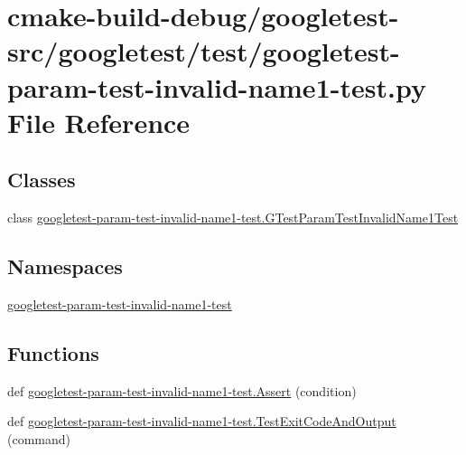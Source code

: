 \hypertarget{googletest-param-test-invalid-name1-test_8py}{}\section{cmake-\/build-\/debug/googletest-\/src/googletest/test/googletest-\/param-\/test-\/invalid-\/name1-\/test.py File Reference}
\label{googletest-param-test-invalid-name1-test_8py}
\subsection*{Classes}
\begin{DoxyCompactItemize}
\item 
class \mbox{\hyperlink{classgoogletest-param-test-invalid-name1-test_1_1GTestParamTestInvalidName1Test}{googletest-\/param-\/test-\/invalid-\/name1-\/test.\+G\+Test\+Param\+Test\+Invalid\+Name1\+Test}}
\end{DoxyCompactItemize}
\subsection*{Namespaces}
\begin{DoxyCompactItemize}
\item 
 \mbox{\hyperlink{namespacegoogletest-param-test-invalid-name1-test}{googletest-\/param-\/test-\/invalid-\/name1-\/test}}
\end{DoxyCompactItemize}
\subsection*{Functions}
\begin{DoxyCompactItemize}
\item 
def \mbox{\hyperlink{namespacegoogletest-param-test-invalid-name1-test_a2322bcd13b9e4fc90292b041a99fe368}{googletest-\/param-\/test-\/invalid-\/name1-\/test.\+Assert}} (condition)
\item 
def \mbox{\hyperlink{namespacegoogletest-param-test-invalid-name1-test_aabb7407b7c6d63bd6b06899c5f5bc02e}{googletest-\/param-\/test-\/invalid-\/name1-\/test.\+Test\+Exit\+Code\+And\+Output}} (command)
\end{DoxyCompactItemize}
